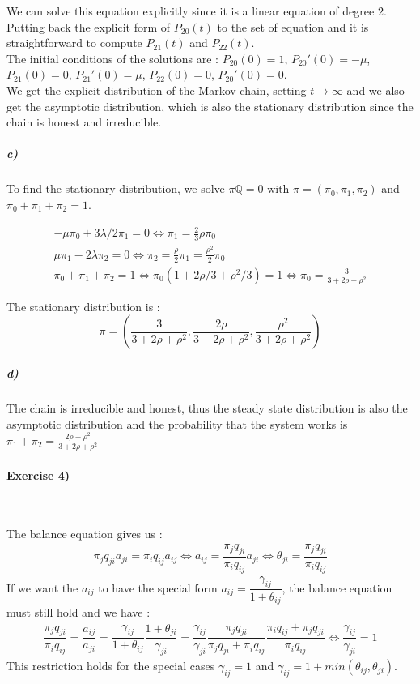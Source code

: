 \documentclass{article}
\begin{document}
We can solve this equation explicitly since it is a linear equation of degree $2$. Putting back the explicit form of $P_{20}(t)$ to the set of equation and it is straightforward to compute $P_{21}(t)$ and $P_{22}(t)$. \\

The initial conditions of the solutions are : $P_{20}(0)=1$, $P_{20}'(0)=-\mu$, $P_{21}(0)=0$, $P_{21}'(0)=\mu$, $P_{22}(0)=0$, $P_{20}'(0)=0$. \\

We get the explicit distribution of the Markov chain, setting $t \rightarrow \infty $ and we also get the asymptotic distribution, which is also the stationary distribution since the chain is honest and irreducible.
\subparagraph{c)} 
To find the stationary distribution, we solve $\pi \mathbb{Q}=0$ with $\pi=(\pi_0,\pi_1,\pi_2)$ and $\pi_0+\pi_1+\pi_2=1$.

\begin{gather*}
-\mu \pi_0+3\lambda /2 \pi_1=0 \iff \pi_1=\frac{2}{3}\rho \pi_0 \\
\mu\pi_1-2\lambda \pi_2=0 \iff \pi_2=\frac{\rho}{2}\pi_1=\frac{\rho^2}{2}\pi_0 \\
\pi_0+\pi_1+\pi_2=1 \iff \pi_0(1+2\rho/3+\rho^2/3)=1 \iff \pi_0=\frac{3}{3+2\rho+\rho^2}
\end{gather*}

The stationary distribution is : 
$$\pi=\left(\frac{3}{3+2\rho+\rho^2},\frac{2\rho}{3+2\rho+\rho^2},\frac{\rho^2}{3+2\rho+\rho^2}\right)$$
\subparagraph{d)}
The chain is irreducible and honest, thus the steady state distribution is also the asymptotic distribution and the probability that the system works is $\pi_1+\pi_2=\frac{2\rho+\rho^2}{3+2\rho+\rho^2}$
\paragraph{Exercise 4)}
\


The balance equation gives us :
\begin{gather*}
\pi_j q_{ji} a_{ji}=\pi_i q_{ij} a_{ij} 
\iff a_{ij}=\dfrac{\pi_j q_{ji}}{\pi_i q_{ij}}a_{ji}
\iff \theta_{ji}=\dfrac{\pi_j q_{ji}}{\pi_i q_{ij}}
\end{gather*}
If we want the $a_{ij}$ to have the special form $a_{ij}=\dfrac{\gamma_{ij}}{1+ \theta_{ij}}$, the balance equation must still hold and we have :
\begin{gather*}
\dfrac{\pi_j q_{ji}}{\pi_i q_{ij}}=\dfrac{a_{ij}}{a_{ji}}=\dfrac{\gamma_{ij}}{1+ \theta_{ij}}\dfrac{1+ \theta_{ji}}{\gamma_{ji}}=\dfrac{\gamma_{ij}}{\gamma_{ji}}
\dfrac{\pi_j q_{ji}}{\pi_j q_{ji}+\pi_i q_{ij}}\dfrac{\pi_i q_{ij}+\pi_j q_{ji}}{\pi_i q_{ij}} 
\iff \dfrac{\gamma_{ij}}{\gamma_{ji}}=1
\end{gather*}
This restriction holds for the special cases $\gamma_{ij}=1$ and $\gamma_{ij}=1+min(\theta_{ij},\theta_{ji})$. \\
\end{document}
